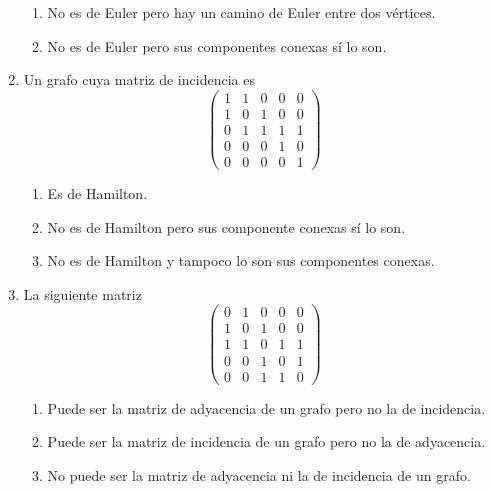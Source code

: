 \begin{ejercicio}
\begin{enumerate}
\begin{enumerate}
            \item No es de Euler pero hay un camino de Euler entre dos vértices.
            \item No es de Euler pero sus componentes conexas sí lo son.
        \end{enumerate}
        \item Un grafo cuya matriz de incidencia es
        \[
            \begin{pmatrix}
                1 & 1 & 0 & 0 & 0 \\
                1 & 0 & 1 & 0 & 0 \\
                0 & 1 & 1 & 1 & 1 \\
                0 & 0 & 0 & 1 & 0 \\
                0 & 0 & 0 & 0 & 1
            \end{pmatrix}
        \]
        \begin{enumerate}
            \item Es de Hamilton.
            \item No es de Hamilton pero sus componente conexas sí lo son.
            \item No es de Hamilton y tampoco lo son sus componentes conexas.
        \end{enumerate}
        \item La siguiente matriz
        \[
            \begin{pmatrix}
                0 & 1 & 0 & 0 & 0 \\
                1 & 0 & 1 & 0 & 0 \\
                1 & 1 & 0 & 1 & 1 \\
                0 & 0 & 1 & 0 & 1 \\
                0 & 0 & 1 & 1 & 0
            \end{pmatrix}
        \]
        \begin{enumerate}
            \item Puede ser la matriz de adyacencia de un grafo pero no la de incidencia.
            \item Puede ser la matriz de incidencia de un grafo pero no la de adyacencia.
            \item No puede ser la matriz de adyacencia ni la de incidencia de un grafo.
        \end{enumerate}
    \end{enumerate}
\end{ejercicio}

